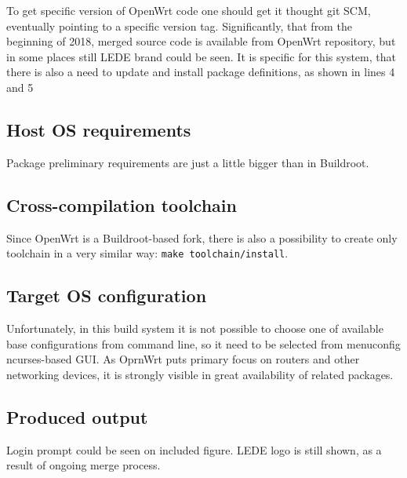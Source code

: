 \documentclass[printmode]{mgr}
\begin{document}
To get specific version of OpenWrt code one should get it thought git SCM, eventually pointing to a specific version tag.
Significantly, that from the beginning of 2018, merged source code is available from OpenWrt repository, but in some places still LEDE brand could be seen.
It is specific for this system, that there is also a need to update and install package definitions, as shown in lines 4 and 5

\subsection*{Host OS requirements}

Package preliminary requirements are just a little bigger than in Buildroot.

\subsection*{Cross-compilation toolchain}

Since OpenWrt is a Buildroot-based fork, there is also a possibility to create only toolchain in a very similar way: \verb|make toolchain/install|.

\subsection*{Target OS configuration}

Unfortunately, in this build system it is not possible to choose one of available base configurations from command line, so it need to be selected from menuconfig ncurses-based GUI.
As OprnWrt puts primary focus on routers and other networking devices, it is strongly visible in great availability of related packages.

\subsection*{Produced output}

Login prompt could be seen on included figure.
LEDE logo is still shown, as a result of ongoing merge process.
\end{document}
